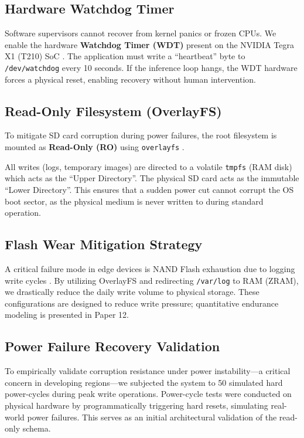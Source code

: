 \documentclass[conference]{IEEEtran}
\begin{document}
\subsection{Hardware Watchdog Timer}
Software supervisors cannot recover from kernel panics or frozen CPUs. We enable the hardware \textbf{Watchdog Timer (WDT)} present on the NVIDIA Tegra X1 (T210) SoC \cite{b25}. The application must write a ``heartbeat'' byte to \texttt{/dev/watchdog} every 10 seconds. If the inference loop hangs, the WDT hardware forces a physical reset, enabling recovery without human intervention.

\subsection{Read-Only Filesystem (OverlayFS)}

To mitigate SD card corruption during power failures, the root filesystem is mounted as \textbf{Read-Only (RO)} using \texttt{overlayfs} \cite{b33}. 

All writes (logs, temporary images) are directed to a volatile \texttt{tmpfs} (RAM disk) which acts as the ``Upper Directory''. The physical SD card acts as the immutable ``Lower Directory''. This ensures that a sudden power cut cannot corrupt the OS boot sector, as the physical medium is never written to during standard operation.

\subsection{Flash Wear Mitigation Strategy}
A critical failure mode in edge devices is NAND Flash exhaustion due to logging write cycles \cite{b15}. By utilizing OverlayFS and redirecting \texttt{/var/log} to RAM (ZRAM), we drastically reduce the daily write volume to physical storage. These configurations are designed to reduce write pressure; quantitative endurance modeling is presented in Paper 12.

\subsection{Power Failure Recovery Validation}
To empirically validate corruption resistance under power instability---a critical concern in developing regions---we subjected the system to 50 simulated hard power-cycles during peak write operations. Power-cycle tests were conducted on physical hardware by programmatically triggering hard resets, simulating real-world power failures. This serves as an initial architectural validation of the read-only schema.
\end{document}
